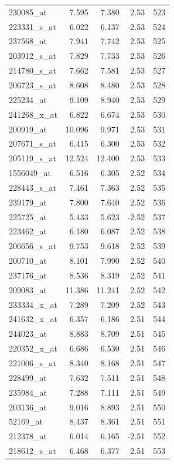 \begin{footnotesize}
\begin{longtable}{lrrrr}
230085\_at & 7.595 & 7.380 & 2.53 & 523 \\
223331\_s\_at & 6.022 & 6.137 & -2.53 & 524 \\
237568\_at & 7.941 & 7.742 & 2.53 & 525 \\
203912\_s\_at & 7.829 & 7.733 & 2.53 & 526 \\
214780\_s\_at & 7.662 & 7.581 & 2.53 & 527 \\
206723\_s\_at & 8.608 & 8.480 & 2.53 & 528 \\
225234\_at & 9.109 & 8.940 & 2.53 & 529 \\
241268\_x\_at & 6.822 & 6.674 & 2.53 & 530 \\
200919\_at & 10.096 & 9.971 & 2.53 & 531 \\
207671\_s\_at & 6.415 & 6.300 & 2.53 & 532 \\
205119\_s\_at & 12.524 & 12.400 & 2.53 & 533 \\
1556049\_at & 6.516 & 6.305 & 2.52 & 534 \\
228443\_s\_at & 7.461 & 7.363 & 2.52 & 535 \\
239179\_at & 7.800 & 7.640 & 2.52 & 536 \\
225725\_at & 5.433 & 5.623 & -2.52 & 537 \\
223462\_at & 6.180 & 6.087 & 2.52 & 538 \\
206656\_s\_at & 9.753 & 9.618 & 2.52 & 539 \\
200710\_at & 8.101 & 7.990 & 2.52 & 540 \\
237176\_at & 8.536 & 8.319 & 2.52 & 541 \\
209083\_at & 11.386 & 11.241 & 2.52 & 542 \\
233334\_x\_at & 7.289 & 7.209 & 2.52 & 543 \\
241632\_x\_at & 6.357 & 6.186 & 2.51 & 544 \\
244023\_at & 8.883 & 8.709 & 2.51 & 545 \\
220352\_x\_at & 6.686 & 6.530 & 2.51 & 546 \\
221006\_s\_at & 8.340 & 8.168 & 2.51 & 547 \\
228499\_at & 7.632 & 7.511 & 2.51 & 548 \\
235984\_at & 7.288 & 7.111 & 2.51 & 549 \\
203136\_at & 9.016 & 8.893 & 2.51 & 550 \\
52169\_at & 8.437 & 8.361 & 2.51 & 551 \\
212378\_at & 6.014 & 6.165 & -2.51 & 552 \\
218612\_s\_at & 6.468 & 6.377 & 2.51 & 553 \\

\end{longtable}
\end{footnotesize}
